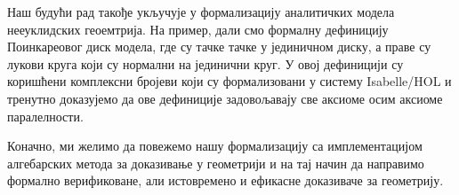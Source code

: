 Наш будући рад такође укључује у формализацију аналитичких модела
нееуклидских геоемтрија. На пример, дали смо формалну дефиницију
Поинкареовог диск модела, где су тачке тачке у јединичном диску, а
праве су лукови круга који су нормални на јединични круг. У овој
дефиницији су коришћени комплексни бројеви који су формализовани у
систему Isabelle/HOL и тренутно доказујемо да ове дефиниције
задовољавају све аксиоме осим аксиоме паралелности.

Коначно, ми желимо да повежемо нашу формализацију са имплементацијом
алгебарских метода за доказивање у геометрији и на тај начин да
направимо формално верификоване, али истовремено и ефикасне доказиваче
за геометрију.



